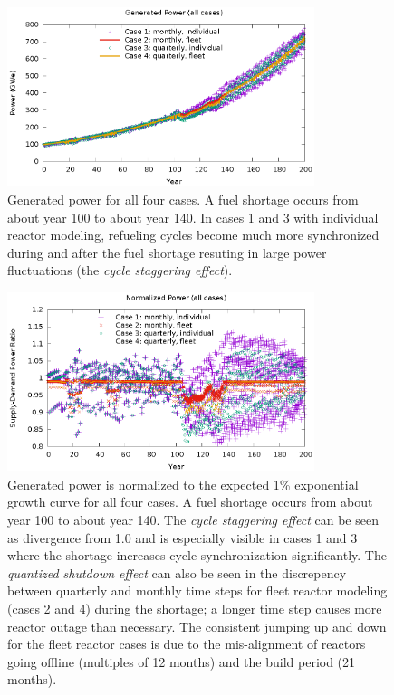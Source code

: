 \documentclass{style}
\begin{document}
\begin{figure}[!h]
    \centering
    \includegraphics[width=0.8\textwidth]{exp2/power.eps}
    \caption[Generated power]{
        Generated power for all four cases.  A fuel shortage occurs from about
        year 100 to about year 140.  In cases 1 and 3 with individual reactor
        modeling, refueling cycles become much more synchronized during and
        after the fuel shortage resuting in large power fluctuations (the
        \emph{cycle staggering effect}).
    }
    \label{fig:power}
\end{figure}

\begin{figure}[!h]
    \centering
    \includegraphics[width=0.8\textwidth]{exp2/power-rel.eps}
    \caption[Normalized power]{
        Generated power is normalized to the expected 1\% exponential growth
        curve for all four cases.  A fuel shortage occurs from about year 100
        to about year 140.  The \emph{cycle staggering effect} can be seen as
        divergence from 1.0 and is especially visible in cases 1 and 3 where
        the shortage increases cycle synchronization significantly. The
        \emph{quantized shutdown effect} can also be seen in the discrepency
        between quarterly and monthly time steps for fleet reactor modeling
        (cases 2 and 4) during the shortage; a longer time step causes more
        reactor outage than necessary. The consistent jumping up and down for
        the fleet reactor cases is due to the mis-alignment of reactors going
        offline (multiples of 12 months) and the build period (21 months).
    }
    \label{fig:power-rel}
\end{figure}
\end{document}
